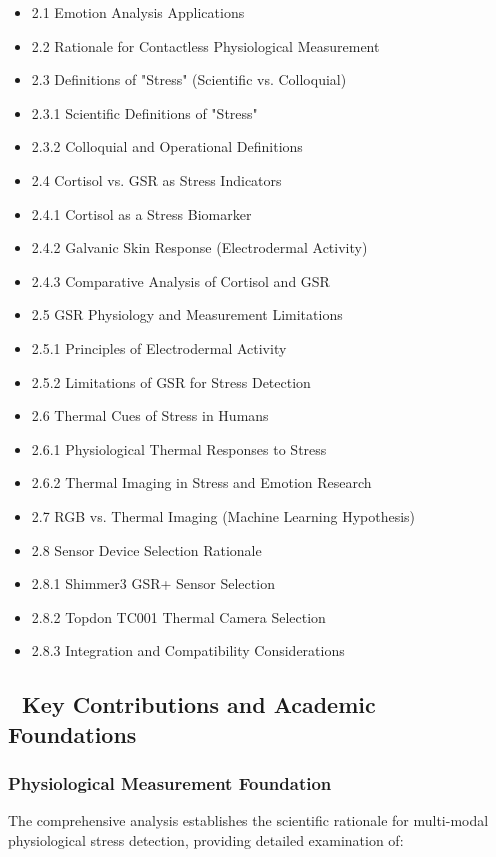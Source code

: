 \documentclass[11pt,a4paper]{article}
\begin{document}
\begin{itemize}
\item 2.1 Emotion Analysis Applications
\item 2.2 Rationale for Contactless Physiological Measurement
\item 2.3 Definitions of "Stress" (Scientific vs. Colloquial)
\item 2.3.1 Scientific Definitions of "Stress"
\item 2.3.2 Colloquial and Operational Definitions
\item 2.4 Cortisol vs. GSR as Stress Indicators
\item 2.4.1 Cortisol as a Stress Biomarker
\item 2.4.2 Galvanic Skin Response (Electrodermal Activity)
\item 2.4.3 Comparative Analysis of Cortisol and GSR
\item 2.5 GSR Physiology and Measurement Limitations
\item 2.5.1 Principles of Electrodermal Activity
\item 2.5.2 Limitations of GSR for Stress Detection
\item 2.6 Thermal Cues of Stress in Humans
\item 2.6.1 Physiological Thermal Responses to Stress
\item 2.6.2 Thermal Imaging in Stress and Emotion Research
\item 2.7 RGB vs. Thermal Imaging (Machine Learning Hypothesis)
\item 2.8 Sensor Device Selection Rationale
\item 2.8.1 Shimmer3 GSR+ Sensor Selection
\item 2.8.2 Topdon TC001 Thermal Camera Selection
\item 2.8.3 Integration and Compatibility Considerations

\end{itemize}
\subsection{🎯 Key Contributions and Academic Foundations}

\subsubsection{Physiological Measurement Foundation}

The comprehensive analysis establishes the scientific rationale for multi-modal physiological stress detection,
providing detailed examination of:
\end{document}
